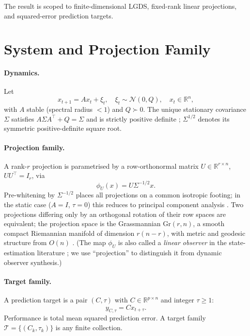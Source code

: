 \documentclass[final,3p,times]{elsarticle}
\newcommand{\Gr}{\mathrm{Gr}}
\newcommand{\R}{\mathbb{R}}
\begin{document}
The result is scoped to finite-dimensional LGDS, fixed-rank linear projections,
and squared-error prediction targets.

\section{System and Projection Family}

\paragraph{Dynamics.}
Let
\begin{equation}
  x_{t+1} = A x_t + \xi_t, \quad \xi_t \sim \mathcal{N}(0, Q),
  \quad x_t \in \R^n,
\end{equation}
with $A$ stable (spectral radius $<1$) and $Q \succ 0$.
The unique stationary covariance $\Sigma$ satisfies
$A \Sigma A^\top + Q = \Sigma$ and is strictly positive definite
\cite{Kailath1980}; $\Sigma^{1/2}$ denotes its symmetric positive-definite
square root.

\paragraph{Projection family.}
A rank-$r$ projection is parametrised by a
row-orthonormal matrix $U \in \R^{r \times n}$, $U U^\top = I_r$, via
\begin{equation}
  \phi_U(x) = U \Sigma^{-1/2} x.
\end{equation}
Pre-whitening by $\Sigma^{-1/2}$ places all projections on a common isotropic
footing; in the static case ($A=I$, $\tau=0$) this reduces to principal
component analysis \cite{Hotelling1933}.
Two projections differing only by an orthogonal rotation of their row spaces are
equivalent; the projection space is the Grassmannian
$\Gr(r,n)$, a smooth compact Riemannian manifold of dimension $r(n-r)$,
with metric and geodesic structure from $O(n)$ \cite{Edelman1998}.
(The map $\phi_U$ is also called a \emph{linear observer} in the state-estimation
literature \cite{Luenberger1971}; we use ``projection'' to distinguish it from
dynamic observer synthesis.)

\paragraph{Target family.}
A prediction target is a pair $(C, \tau)$ with $C \in \R^{p \times n}$ and
integer $\tau \ge 1$:
\begin{equation}
  y_{C,\tau} = C x_{t+\tau}.
\end{equation}
Performance is total mean squared prediction error.
A target family $\mathcal{T} = \{(C_k, \tau_k)\}$ is any finite collection.
\end{document}
